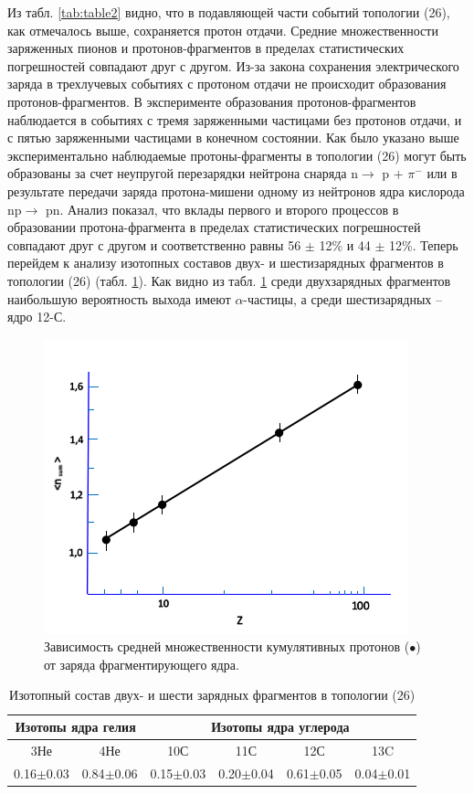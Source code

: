 \documentclass[fontsize=14pt]{scrarticle}
\begin{document}
Из табл. \ref{tab:table2} видно, что в подавляющей части событий топологии (26), как отмечалось выше, сохраняется протон отдачи. Средние множественности заряженных пионов и протонов-фрагментов в пределах статистических погрешностей совпадают друг с другом. Из-за закона сохранения электрического заряда в трехлучевых событиях с протоном отдачи не происходит образования протонов-фрагментов. В эксперименте образования протонов-фрагментов наблюдается в событиях с тремя заряженными частицами без протонов отдачи, и с пятью заряженными частицами в конечном состоянии. Как было указано выше экспериментально наблюдаемые протоны-фрагменты в топологии (26) могут быть образованы за счет неупругой перезарядки нейтрона снаряда       n$\rightarrow$ p + $\pi^{-}$ или в результате передачи заряда протона-мишени одному из нейтронов ядра кислорода np$\rightarrow$ pn. Анализ показал, что вклады первого и второго процессов в образовании протона-фрагмента в пределах статистических погрешностей совпадают друг с другом и соответственно равны 56 $\pm$ 12\% и      44 $\pm$ 12\%. Теперь перейдем к анализу изотопных составов двух- и шестизарядных фрагментов в топологии (26) (табл. \ref{tab:table3}). Как видно из табл. \ref{tab:table3} среди двухзарядных фрагментов наибольшую вероятность выхода имеют $\alpha$-частицы, а среди шестизарядных – ядро 12-С. 

\begin{figure}[!ht]
\centerline{\includegraphics{picture12.png}}
\caption{Зависимость средней множественности кумулятивных протонов ($\bullet$) от заряда фрагментирующего ядра.}
\label{fig13}
\end{figure}

\begin{table}[h]
    \centering
    \begin{tabular}{|c|c|c|c|c|c|}
    \hline
        \multicolumn{2}{|c|}{Изотопы ядра гелия}&\multicolumn{4}{c|}{Изотопы ядра углерода}\\
        \hline
        3Не&	4Не&	10С&	11С&	12С&	13C\\
        \hline
        0.16$\pm$0.03&	0.84$\pm$0.06&	0.15$\pm$0.03&	0.20$\pm$0.04&	0.61$\pm$0.05&	0.04$\pm$0.01\\ \hline

    \end{tabular}
    \caption{Изотопный состав двух- и шести зарядных фрагментов в топологии (26)}
    \label{tab:table3}
\end{table}
\end{document}
